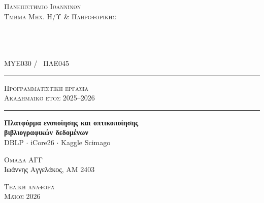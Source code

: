 \thispagestyle{empty}
\begin{titlepage}
    \begin{flushright}
        \small\textsc{Πανεπιστήμιο Ιωαννίνων}\\
        \small\textsc{Τμήμα Μηχ. Η/Υ \& Πληροφορικής}
    \end{flushright}

    \vspace{2cm}
    \begin{center}
        {\Large\bfseries{}}\\[0.4em]
        {\Large\bfseries{}}\\[0.4em]
        {\Large\bfseries{}}\\[0.4em]
        {\normalsize MYE030 / \ ΠΛΕ045}
    \end{center}

    \vspace{2cm}
    \rule{\textwidth}{0.6pt}
    \begin{center}
        {\Large\textsc{Προγραμματιστική εργασία}}\\[0.4em]
        {\large\textsc{Ακαδημαϊκό έτος 2025--2026}}
    \end{center}
    \rule{\textwidth}{0.6pt}

    \vspace{1.5cm}
    \begin{center}
        {\large\textbf{Πλατφόρμα ενοποίησης και οπτικοποίησης}}\\[0.2em]
        {\large\textbf{βιβλιογραφικών δεδομένων}}\\[0.6em]
        {\small DBLP $\cdot$ iCore26 $\cdot$ Kaggle Scimago}
    \end{center}

    \vfill
    \begin{center}
        {\large\textsc{Ομάδα ΑΓΓ}}\\[0.6em]
        {\large Ιωάννης Αγγελάκος, ΑΜ 2403}
    \end{center}

    \vspace{1.5cm}
    \begin{center}
        \small\textsc{Τελική αναφορά}\\
        \small\textsc{Μάιος 2026}
    \end{center}
\end{titlepage}
\cleardoublepage

